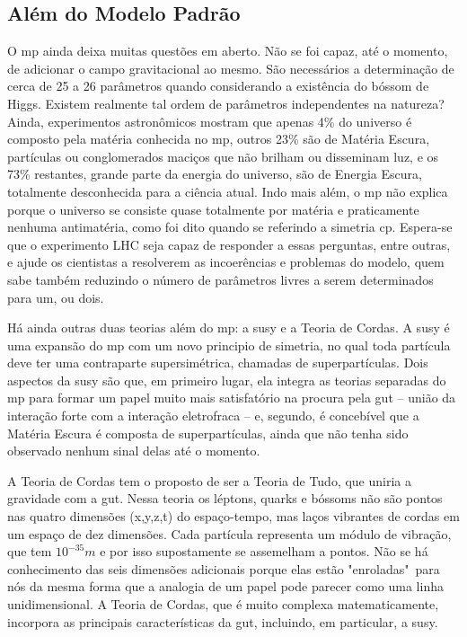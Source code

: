 \subsection{Além do Modelo Padrão}
\label{ssec:alem_do_mp}

O \gls{mp} ainda deixa muitas questões em aberto. Não se foi capaz, até o
momento, de adicionar o campo gravitacional ao mesmo. São necessários a
determinação de cerca de 25 a 26 parâmetros quando considerando a existência do
bóssom de Higgs. Existem realmente tal ordem de parâmetros independentes na
natureza? Ainda, experimentos astronômicos mostram que apenas 4\% do universo é
composto pela matéria conhecida no \gls{mp}, outros 23\% são de Matéria
Escura, partículas ou conglomerados maciços que não brilham ou disseminam luz,
e os 73\% restantes, grande parte da energia do universo, são de Energia Escura,
totalmente desconhecida para a ciência atual. Indo mais além, o \gls{mp} 
não explica porque o universo se consiste quase totalmente por matéria e
praticamente nenhuma antimatéria, como foi dito quando se referindo a simetria
\gls{cp}. Espera-se que o experimento LHC seja capaz de responder a essas perguntas, entre outras, 
e ajude os cientistas a resolverem as incoerências e problemas do modelo, quem sabe também reduzindo 
o número de parâmetros livres a serem determinados para um, ou dois.
\cite{nature_space_and_time,Intro_Nuclear}


Há ainda outras duas teorias além do \gls{mp}: a \gls{susy} e a Teoria de Cordas. 
A \gls{susy} é uma expansão do \gls{mp} com um
novo principio de simetria, no qual toda partícula deve ter uma contraparte
supersimétrica, chamadas de superpartículas. Dois aspectos da \gls{susy} são
que, em primeiro lugar, ela integra as teorias separadas do \gls{mp} para formar
um papel muito mais satisfatório na procura pela \gls{gut} -- união da interação
forte com a interação eletrofraca -- e, segundo, é concebível que a Matéria Escura 
é composta de superpartículas, ainda que não tenha sido observado nenhum sinal delas 
até o momento. 

A Teoria de Cordas tem o proposto de ser a Teoria de Tudo, que uniria a
gravidade com a \gls{gut}. Nessa teoria os léptons, quarks e bóssoms não são
pontos nas quatro dimensões (x,y,z,t) do espaço-tempo, mas laços vibrantes de
cordas em um espaço de dez dimensões. Cada partícula representa um módulo de
vibração, que tem $10^{-35} m$ e por isso supostamente se
assemelham a pontos. Não se há conhecimento das seis dimensões adicionais porque
elas estão "enroladas"~para nós da mesma forma que a analogia de um papel pode
parecer como uma linha unidimensional. A Teoria de Cordas, que é muito complexa
matematicamente, incorpora as principais características da \gls{gut}, incluindo,
em particular, a \gls{susy}.

